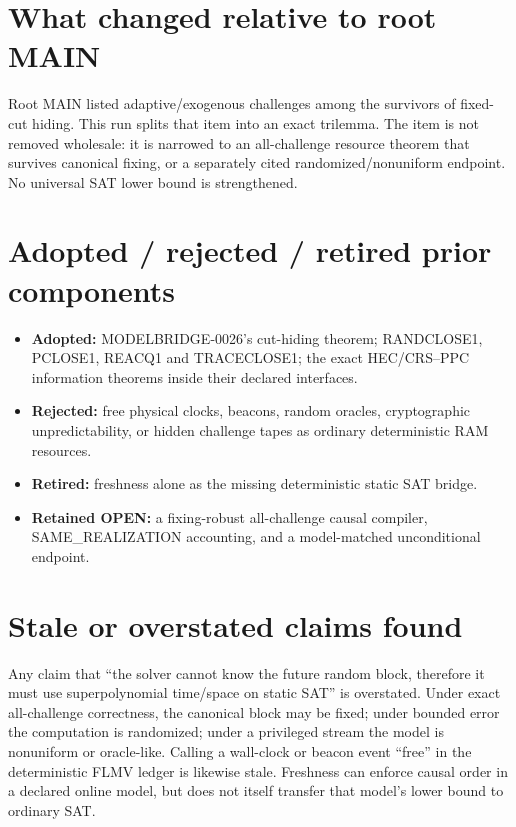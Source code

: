 \documentclass[11pt]{article}
\begin{document}
\section{What changed relative to root MAIN}

Root MAIN listed adaptive/exogenous challenges among the survivors of fixed-
cut hiding.  This run splits that item into an exact trilemma.  The item is
not removed wholesale: it is narrowed to an all-challenge resource theorem
that survives canonical fixing, or a separately cited randomized/nonuniform
endpoint.  No universal SAT lower bound is strengthened.

\section{Adopted / rejected / retired prior components}

\begin{itemize}[leftmargin=1.5em]
\item \textbf{Adopted:} MODELBRIDGE-0026's cut-hiding theorem; RANDCLOSE1,
PCLOSE1, REACQ1 and TRACECLOSE1; the exact HEC/CRS--PPC information theorems
inside their declared interfaces.
\item \textbf{Rejected:} free physical clocks, beacons, random oracles,
cryptographic unpredictability, or hidden challenge tapes as ordinary
deterministic RAM resources.
\item \textbf{Retired:} freshness alone as the missing deterministic static
SAT bridge.
\item \textbf{Retained OPEN:} a fixing-robust all-challenge causal compiler,
SAME\_REALIZATION accounting, and a model-matched unconditional endpoint.
\end{itemize}

\section{Stale or overstated claims found}

Any claim that ``the solver cannot know the future random block, therefore it
must use superpolynomial time/space on static SAT'' is overstated.  Under exact
all-challenge correctness, the canonical block may be fixed; under bounded
error the computation is randomized; under a privileged stream the model is
nonuniform or oracle-like.  Calling a wall-clock or beacon event ``free'' in
the deterministic FLMV ledger is likewise stale.  Freshness can enforce
causal order in a declared online model, but does not itself transfer that
model's lower bound to ordinary SAT.
\end{document}
